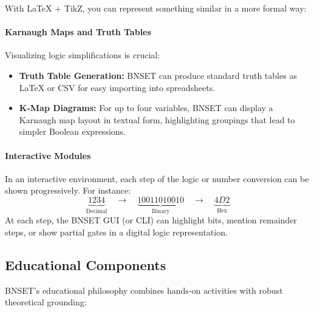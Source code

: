 \documentclass{article}
\begin{document}
\noindent With \LaTeX{} + TikZ, you can represent something similar in a more formal way:

\begin{center}
\end{center}

\paragraph{Karnaugh Maps and Truth Tables}
Visualizing logic simplifications is crucial:
\begin{itemize}
  \item \textbf{Truth Table Generation:} BNSET can produce standard truth tables as \LaTeX{} or CSV for easy importing into spreadsheets.
  \item \textbf{K-Map Diagrams:} For up to four variables, BNSET can display a Karnaugh map layout in textual form, highlighting groupings that lead to simpler Boolean expressions.
\end{itemize}

\paragraph{Interactive Modules}
In an interactive environment, each step of the logic or number conversion can be shown progressively. For instance:
\[
\underbrace{1234}_{\text{Decimal}} \quad \longrightarrow \quad \underbrace{10011010010}_{\text{Binary}} \quad \longrightarrow \quad \underbrace{4D2}_{\text{Hex}}
\]
At each step, the BNSET GUI (or CLI) can highlight bits, mention remainder steps, or show partial gates in a digital logic representation.

\subsection{Educational Components}
\label{sec:educational-components}
BNSET’s educational philosophy combines hands-on activities with robust theoretical grounding:
\end{document}
